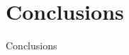 \documentclass{beamer}
\begin{document}

\section{Conclusions}

\begin{frame}{Conclusions}
\end{frame}
\end{document}
